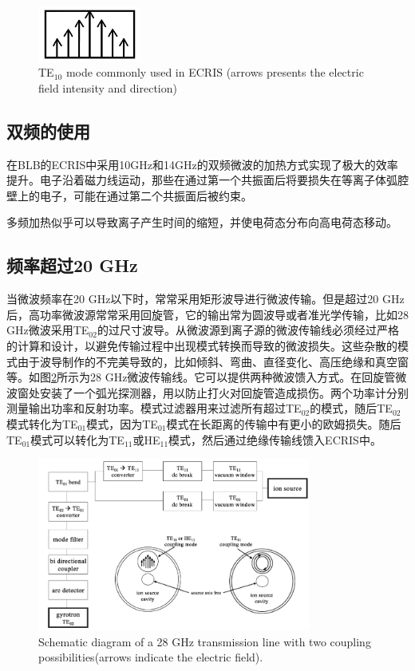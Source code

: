 \documentclass[fontset=windows]{article}
\begin{document}
\begin{figure}
    \centering
    \includegraphics[width=0.3\textwidth]{TE10.png}
    \caption{TE$_{10}$ mode commonly used in ECRIS (arrows presents the electric field intensity
    and direction)}
    \label{TE10}
\end{figure}

\subsection{双频的使用}
在BLB的ECRIS中采用10GHz和14GHz的双频微波的加热方式实现了极大的效率提升。电子沿着磁力线运动，那些在通过第一个共振面后将要损失在等离子体弧腔壁上的电子，可能在通过第二个共振面后被约束。

多频加热似乎可以导致离子产生时间的缩短，并使电荷态分布向高电荷态移动。

\subsection{频率超过20 GHz}

当微波频率在20 GHz以下时，常常采用矩形波导进行微波传输。但是超过20 GHz后，高功率微波源常常采用回旋管，它的输出常为圆波导或者准光学传输，比如28 GHz微波采用TE$_{02}$的过尺寸波导。从微波源到离子源的微波传输线必须经过严格的计算和设计，以避免传输过程中出现模式转换而导致的微波损失。这些杂散的模式由于波导制作的不完美导致的，比如倾斜、弯曲、直径变化、高压绝缘和真空窗等。如图\ref{f-3}所示为28 GHz微波传输线。它可以提供两种微波馈入方式。在回旋管微波窗处安装了一个弧光探测器，用以防止打火对回旋管造成损伤。两个功率计分别测量输出功率和反射功率。模式过滤器用来过滤所有超过TE$_{02}$的模式，随后TE$_{02}$模式转化为TE$_{01}$模式，因为TE$_{01}$模式在长距离的传输中有更小的欧姆损失。随后TE$_{01}$模式可以转化为TE$_{11}$或HE$_{11}$模式，然后通过绝缘传输线馈入ECRIS中。

\begin{figure}
    \centering
    \includegraphics[width=0.8\textwidth]{Schematic diagram.png}
    \caption{Schematic diagram of a 28 GHz transmission line with two coupling possibilities(arrows indicate the electric field).}
    \label{f-3}
\end{figure}
\end{document}
